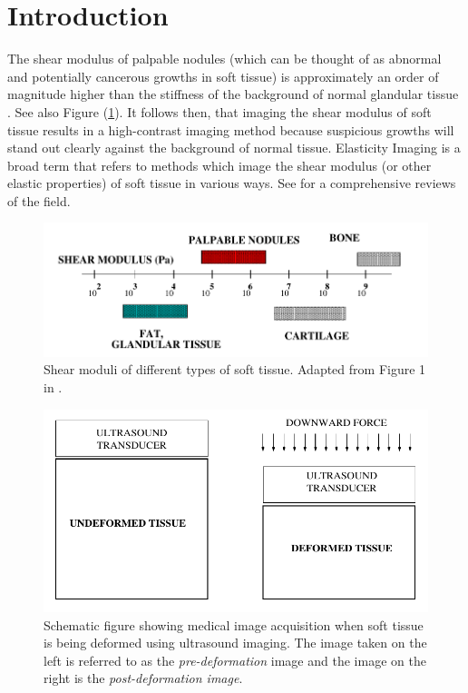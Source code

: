 \documentclass[12pt]{article}
\begin{document}
\section{Introduction}
The shear modulus of palpable nodules (which can be thought of as abnormal and potentially cancerous growths in soft tissue) is approximately an order of magnitude higher than the stiffness of the background of normal glandular tissue \cite{paper:sarv1998}. See also Figure (\ref{fig:shearmod}). It follows then, that imaging the shear modulus of soft tissue results in a high-contrast imaging method because suspicious growths will stand out clearly against the background of normal tissue. Elasticity Imaging is a broad term that refers to methods which image the shear modulus (or other elastic properties) of soft tissue in various ways. See \cite{paper:gao1996,paper:parker2010,book:alamgarra2019,bookchap:oberaibarbone2019} for a comprehensive reviews of the field.
%
\begin{figure}[h]
   \centering
    \includegraphics[totalheight=3cm]{Figures/shearmod.png}
  \caption{\label{fig:shearmod} Shear moduli of different types of soft tissue. Adapted from Figure 1 in \cite{paper:sarv1998}.}
\end{figure}
%
\begin{figure}[h]
   \centering
    \includegraphics[totalheight=5cm]{Figures/prepostimage.png}
  \caption{\label{fig:prepostimage} Schematic figure showing medical image acquisition when soft tissue is being deformed using ultrasound imaging. The image taken on the left is referred to as the \textit{pre-deformation} image and the image on the right is the \textit{post-deformation image}.}
\end{figure}
%
\end{document}

